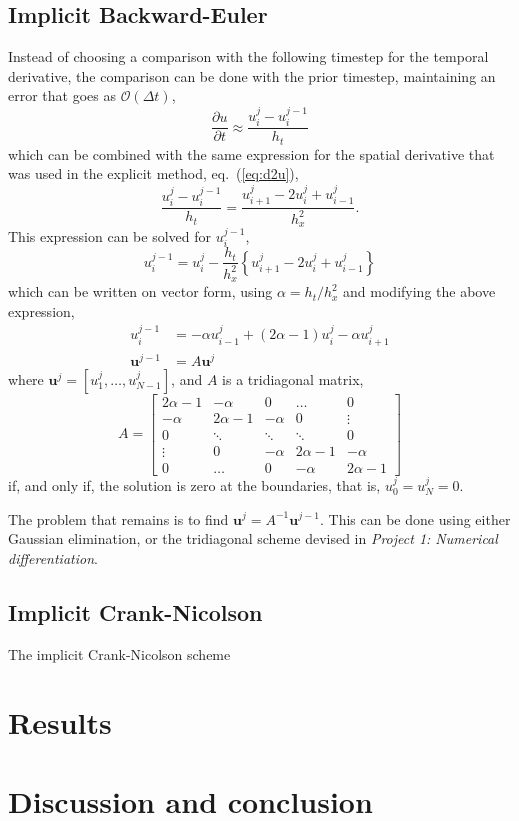 \documentclass[a4paper,11pt]{article}
\begin{document}
\subsection{Implicit Backward-Euler}
Instead of choosing a comparison with the following timestep for the temporal derivative, the comparison can be done with the prior timestep, maintaining an error that goes as $\mathcal{O}(\Delta t)$,
\begin{equation}
    \frac{\partial u}{\partial t} \approx \frac{u^{j}_i - u^{j-1}_i}{h_t}
    \label{eq:du_impl}
\end{equation}
which can be combined with the same expression for the spatial derivative that was used in the explicit method, eq.~(\ref{eq:d2u}),
\[ \frac{u^{j}_i - u^{j-1}_i}{h_t} = \frac{u^j_{i+1} - 2 u^j_{i} + u^j_{i-1}}{h_x^2}. \]
This expression can be solved for $u^{j-1}_i$,
\[
    u^{j-1}_i = u^{j}_i - \frac{h_t}{h_x^2} \left\{ u^j_{i+1} - 2 u^j_{i} + u^j_{i-1} \right\}
\]
which can be written on vector form, using $\alpha = h_t / h_x^2$ and modifying the above expression,
\begin{align*}
    u^{j-1}_i   &= -\alpha u^j_{i-1} + \left( 2\alpha -1 \right) u^j_{i} - \alpha u^j_{i+1} \\
    \mathbf{u}^{j-1} &= A \mathbf{u}^j
\end{align*}
where $\mathbf{u}^j = [u^j_1, \dots, u^j_{N-1}]$, and $A$ is a tridiagonal matrix,
\[ A = 
    \begin{bmatrix}
        2\alpha-1   & -\alpha& 0        & \dots     & 0 \\
        -\alpha     & 2\alpha-1&-\alpha & 0         & \vdots \\
        0           & \ddots & \ddots   & \ddots    & 0  \\
        \vdots      & 0      &-\alpha   & 2\alpha-1 &-\alpha \\
        0           & \dots  & 0        &-\alpha    & 2\alpha-1
    \end{bmatrix}
\]
if, and only if, the solution is zero at the boundaries, that is, $u^j_0 = u^j_N = 0$.

The problem that remains is to find $\mathbf{u}^j = A^{-1} \mathbf{u}^{j-1}$. This can be done using either Gaussian elimination, or the tridiagonal scheme devised in \textit{Project 1: Numerical differentiation}. 

\subsection{Implicit Crank-Nicolson}
The implicit Crank-Nicolson scheme 

\section{Results}
\section{Discussion and conclusion}




\end{document}
